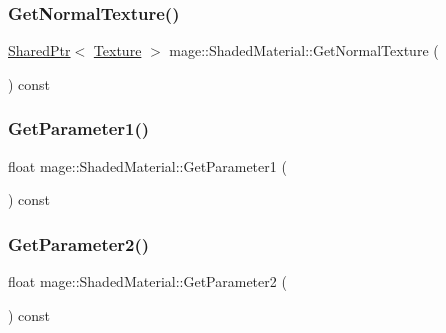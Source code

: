 \hypertarget{structmage_1_1_shaded_material_a879b003bf09d4985c028d134cdbe46eb}{}\label{structmage_1_1_shaded_material_a879b003bf09d4985c028d134cdbe46eb} 
\subsubsection{\texorpdfstring{Get\+Normal\+Texture()}{GetNormalTexture()}}
{\footnotesize\ttfamily \hyperlink{namespacemage_a1e01ae66713838a7a67d30e44c67703e}{Shared\+Ptr}$<$ \hyperlink{classmage_1_1_texture}{Texture} $>$ mage\+::\+Shaded\+Material\+::\+Get\+Normal\+Texture (\begin{DoxyParamCaption}{ }\end{DoxyParamCaption}) const\hspace{0.3cm}{\ttfamily [noexcept]}}

\hypertarget{structmage_1_1_shaded_material_a896c5cc584d24d420b8fe7939905633d}{}\label{structmage_1_1_shaded_material_a896c5cc584d24d420b8fe7939905633d} 
\subsubsection{\texorpdfstring{Get\+Parameter1()}{GetParameter1()}}
{\footnotesize\ttfamily float mage\+::\+Shaded\+Material\+::\+Get\+Parameter1 (\begin{DoxyParamCaption}{ }\end{DoxyParamCaption}) const\hspace{0.3cm}{\ttfamily [noexcept]}}

\hypertarget{structmage_1_1_shaded_material_aad19a7947f7904fa204092c7df945a9b}{}\label{structmage_1_1_shaded_material_aad19a7947f7904fa204092c7df945a9b} 
\subsubsection{\texorpdfstring{Get\+Parameter2()}{GetParameter2()}}
{\footnotesize\ttfamily float mage\+::\+Shaded\+Material\+::\+Get\+Parameter2 (\begin{DoxyParamCaption}{ }\end{DoxyParamCaption}) const\hspace{0.3cm}{\ttfamily [noexcept]}}


